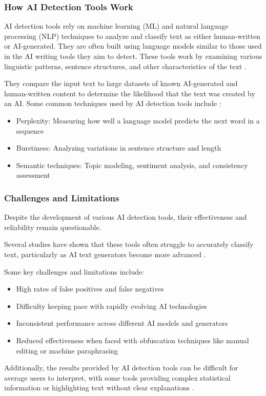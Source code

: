 \documentclass{article}
\begin{document}
\subsubsection{How AI Detection Tools Work}
AI detection tools rely on machine learning (ML)
and natural language processing (NLP) techniques to analyze and
classify text as either human-written or AI-generated.
They are often built using language models similar to those used
in the AI writing tools they aim to detect.
These tools work by examining various linguistic patterns, sentence structures,
and other characteristics of the text
\cite{surferseo_ai_content_detectors}
\cite{scribbr_ai_detectors}
\cite{contadu_ai_detection}.

They compare the input text to large datasets of known AI-generated
and human-written content to determine the likelihood that the text
was created by an AI.
Some common techniques used by AI detection tools include
\cite{surferseo_ai_content_detectors}
\cite{contadu_ai_detection}:

\begin{itemize}
    \item Perplexity: Measuring how well a language model predicts the next word in a sequence
    \item Burstiness: Analyzing variations in sentence structure and length
    \item Semantic techniques: Topic modeling, sentiment analysis, and consistency assessment
\end{itemize}
\subsubsection{Challenges and Limitations}
Despite the development of various AI detection tools,
their effectiveness and reliability remain questionable.

Several studies have shown that these tools often struggle to accurately classify text,
particularly as AI text generators become more advanced
\cite{scribbr_ai_detectors}
\cite{contadu_ai_detection}
\cite{biomedcentral_ai_detection}.

Some key challenges and limitations include:
\begin{itemize}
    \item High rates of false positives and false negatives \cite{scribbr_ai_detectors} \cite{biomedcentral_ai_detection} \cite{kb_iu_chatgpt}
    \item Difficulty keeping pace with rapidly evolving AI technologies \cite{surferseo_ai_content_detectors} \cite{contadu_ai_detection}
    \item Inconsistent performance across different AI models and generators \cite{biomedcentral_ai_detection}
    \item Reduced effectiveness when faced with obfuscation techniques like manual editing or machine paraphrasing \cite{biomedcentral_ai_detection_variation}
\end{itemize}
Additionally, the results provided by AI detection tools can be difficult
for average users to interpret, with some tools providing complex statistical
information or highlighting text without clear explanations
\cite{biomedcentral_ai_detection_variation}.
\end{document}
